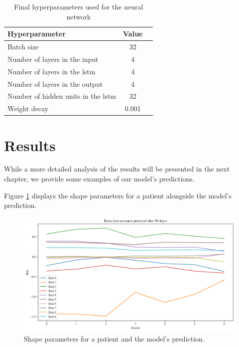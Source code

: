 \begin{table}[h]
    \centering
    \begin{tabular}{l c c}
        \toprule
        \textbf{Hyperparameter}                  & \textbf{Value} \\
        \midrule
        Batch size                               & 32             \\
        Number of layers in the input            & 4              \\
        Number of layers in the \gls{lstm}       & 4              \\
        Number of layers in the output           & 4              \\
        Number of hidden units in the \gls{lstm} & 32             \\
        Weight decay                             & 0.001          \\
        \bottomrule
    \end{tabular}
    \caption{Final hyperparameters used for the neural network}
    \label{tab:final-hyperparameters}
\end{table}

\section{Results}

While a more detailed analysis of the results will be presented in the next
chapter, we provide some examples of our model's predictions.

Figure \ref{fig:predicted-betas} displays the shape parameters for a patient
alongside the model's prediction.

\begin{figure}[h]
    \centering
    \includegraphics[width=\textwidth]{files/predicted_betas}
    \caption{Shape parameters for a patient and the model's prediction.}
    \label{fig:predicted-betas}
\end{figure}

